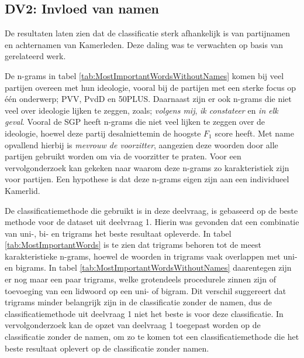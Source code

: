 \subsection{DV2: Invloed van namen}
De resultaten laten zien dat de classificatie sterk afhankelijk is van partijnamen en achternamen van Kamerleden. Deze daling was te verwachten op basis van gerelateerd werk.\par
De n-grams in tabel \ref{tab:MostImportantWordsWithoutNames} komen bij veel partijen overeen met hun ideologie, vooral bij de partijen met een sterke focus op één onderwerp; PVV, PvdD en 50PLUS. Daarnaast zijn er ook n-grams die niet veel over ideologie lijken te zeggen, zoals; \textit{volgens mij}, \textit{ik constateer} en \textit{in elk geval}. Vooral de SGP heeft n-grams die niet veel lijken te zeggen over de ideologie, hoewel deze partij desalniettemin de hoogste $F_1$ score heeft. Met name opvallend hierbij is \textit{mevrouw de voorzitter}, aangezien deze woorden door alle partijen gebruikt worden om via de voorzitter te praten. Voor een vervolgonderzoek kan gekeken naar waarom deze n-grams zo karakteristiek zijn voor partijen. Een hypothese is dat deze n-grams eigen zijn aan een individueel Kamerlid.\par
De classificatiemethode die gebruikt is in deze deelvraag, is gebaseerd op de beste methode voor de dataset uit deelvraag 1. Hierin was gevonden dat een combinatie van uni-, bi- en trigrams het beste resultaat opleverde. In tabel \ref{tab:MostImportantWords} is te zien dat trigrams behoren tot de meest karakteristieke n-grams, hoewel de woorden in trigrams vaak overlappen met uni- en bigrams. In tabel \ref{tab:MostImportantWordsWithoutNames} daarentegen zijn er nog maar een paar trigrams, welke grotendeels procedurele zinnen zijn of toevoeging van een lidwoord op een uni- of bigram. Dit verschil suggereert dat trigrams minder belangrijk zijn in de classificatie zonder de namen, dus de classificatiemethode uit deelvraag 1 niet het beste is voor deze classificatie. In vervolgonderzoek kan de opzet van deelvraag 1 toegepast worden op de classificatie zonder de namen, om zo te komen tot een classificatiemethode die het beste resultaat oplevert op de classificatie zonder namen.\par 

